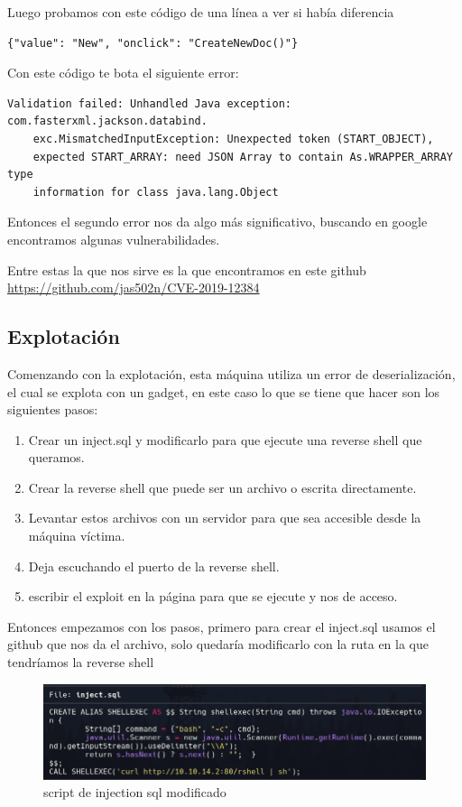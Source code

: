 \documentclass{article}
\begin{document}
Luego probamos con este código de una línea a ver si había diferencia
\begin{lstlisting}[language={[ANSI]C}]  
	{"value": "New", "onclick": "CreateNewDoc()"}
\end{lstlisting}

Con este código te bota el siguiente error:
\begin{lstlisting}[language={[ANSI]C}]  
	Validation failed: Unhandled Java exception: com.fasterxml.jackson.databind.
	exc.MismatchedInputException: Unexpected token (START_OBJECT), 
	expected START_ARRAY: need JSON Array to contain As.WRAPPER_ARRAY type 
	information for class java.lang.Object
\end{lstlisting}

Entonces el segundo error nos da algo más significativo, buscando en google encontramos algunas vulnerabilidades.

Entre estas la que nos sirve es la que encontramos en este github \href{https://github.com/jas502n/CVE-2019-12384}{https://github.com/jas502n/CVE-2019-12384}

\subsection{Explotación}
Comenzando con la explotación, esta máquina utiliza un error de deserialización, el cual se explota con un gadget, en este caso lo que se tiene que hacer son los siguientes pasos: 
\begin{enumerate}
	\item Crear un inject.sql y modificarlo para que ejecute una reverse shell que queramos.
	\item Crear la reverse shell que puede ser un archivo o escrita directamente.
	\item Levantar estos archivos con un servidor para que sea accesible desde la máquina víctima.
	\item Deja escuchando el puerto de la reverse shell.
	\item escribir el exploit en la página para que se ejecute y nos de acceso.
\end{enumerate} 

Entonces empezamos con los pasos, primero para crear el inject.sql usamos el github que nos da el archivo, solo quedaría modificarlo con la ruta en la que tendríamos la reverse shell 

\begin{figure}[H]
	\center
	\includegraphics[width=\textwidth]{images/time/injection.png}
	\caption{script de injection sql modificado}
\end{figure}
\end{document}
